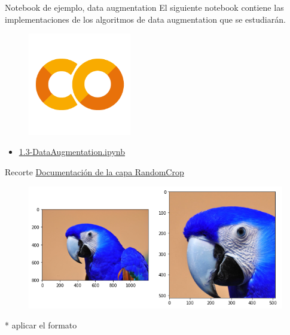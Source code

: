 \begin{frame}{Notebook de ejemplo, data augmentation}
El siguiente notebook contiene las implementaciones de los algoritmos de data augmentation que se estudiarán.

\begin{figure}
    \centering
    \includegraphics[width=0.4\textwidth]{figures/GoogleColab.png}
\end{figure}
\begin{itemize}
    \centering
    \item {\Large \href{https://colab.research.google.com/drive/12G2Ijal10Fa0U_3obrwKkmuSccqIGUNq?usp=sharing}{1.3-DataAugmentation.ipynb}}
\end{itemize}
\end{frame}

\begin{frame}{Recorte}
\label{section:Recorte}
\textcolor{blue}{\href{https://keras.io/api/layers/preprocessing_layers/image_augmentation/random_crop/}{Documentación de la capa RandomCrop}}
\begin{figure}
    \centering
    \includegraphics[width=\textwidth]{figures/Tema 3/Crop.png}
\end{figure}

* aplicar el formato 
\end{frame}


